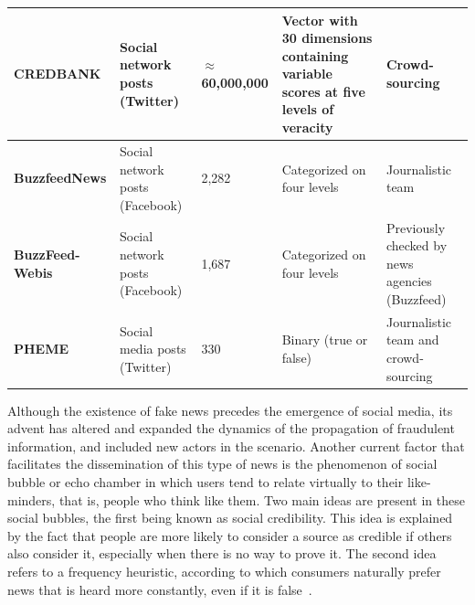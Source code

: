 \documentclass{ieeeaccess}
\begin{document}
\begin{table} [tb!]
\begin{tabular}{|M{.16\textwidth}|M{.12\textwidth}|M{.1\textwidth}|M{.3\textwidth}|M{.2\textwidth}|}
\hline
\textbf{CREDBANK} \cite{mitra2015credbank}               & Social network posts (Twitter)                & $\approx$60,000,000             & Vector with 30 dimensions containing variable scores at five levels of veracity                                                      & Crowd-sourcing                                                         \\ 
\hline
\textbf{BuzzfeedNews}                                                   & Social network posts (Facebook)               & 2,282            & Categorized on four levels                                                                                                               & Journalistic team                                                    \\ 
\hline
\textbf{BuzzFeed-Webis} \cite{potthast2017stylometric}   & Social network posts (Facebook)               & 1,687            & Categorized on four levels                                                                                                               & Previously checked by news agencies (Buzzfeed)                \\ 
\hline
\textbf{PHEME} \cite{zubiaga2016analysing}               & Social media posts (Twitter)                & 330             & Binary (true or false)                                                                                                           & Journalistic team and crowd-sourcing                                           \\
\hline
\end{tabular}
\end{table}

Although the existence of fake news precedes the emergence of social media, its advent has altered and expanded the dynamics of the propagation of fraudulent information, and included new actors in the scenario. Another current factor that facilitates the dissemination of this type of news is the phenomenon of social bubble or echo chamber  in which users tend to relate virtually to their like-minders, that is, people who think like them. Two main ideas are present in these social bubbles, the first being known as social credibility. This idea is explained by the fact that people are more likely to consider a source as credible if others also consider it, especially when there is no way to prove it. The second idea refers to a frequency heuristic, according to which consumers naturally prefer news that is heard more constantly, even if it is false~\cite{shu2017fake}.
\end{document}
